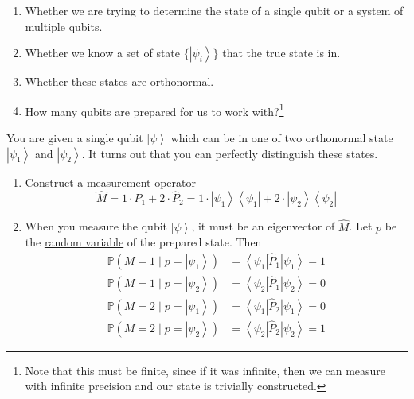 \documentclass{article}
\newcommand{\ket}[1]{\ensuremath{\left|#1\right\rangle}}
\newcommand{\bra}[1]{\ensuremath{\left\langle#1\right|}}
\newcounter{example}[section]
\begin{document}
    \begin{enumerate}
      \item Whether we are trying to determine the state of a single qubit or a system of multiple qubits. 
      \item Whether we know a set of state $\{\ket{\psi_i}\}$ that the true state is in. 
      \item Whether these states are orthonormal. 
      \item How many qubits are prepared for us to work with?\footnote{Note that this must be finite, since if it was infinite, then we can measure with infinite precision and our state is trivially constructed.}
    \end{enumerate}

    \begin{example}
      \label{ex:distinguishing-two-orthonormal-states}
      You are given a single qubit $\ket{\psi}$ which can be in one of two orthonormal state $\ket{\psi_1}$ and $\ket{\psi_2}$. It turns out that you can perfectly distinguish these states. 
      \begin{enumerate}
        \item Construct a measurement operator 
          \begin{equation}
            \hat{M} = 1 \cdot \hat{P}_1 + 2 \cdot \hat{P}_2 = 1 \cdot \ket{\psi_1} \bra{\psi_1} + 2 \cdot \ket{\psi_2} \bra{\psi_2} 
          \end{equation}
        \item When you measure the qubit $\ket{\psi}$, it must be an eigenvector of $\hat{M}$. Let $p$ be the \hyperref[prob-def:random-variable]{random variable} of the prepared state. Then 
          \begin{align}
            \mathbb{P}(M = 1 \mid p = \ket{\psi_1}) & = \bra{\psi_1} \hat{P}_1 \ket{\psi_1} = 1 \\ 
            \mathbb{P}(M = 1 \mid p = \ket{\psi_2}) & = \bra{\psi_2} \hat{P}_1 \ket{\psi_2} = 0 \\ 
            \mathbb{P}(M = 2 \mid p = \ket{\psi_1}) & = \bra{\psi_1} \hat{P}_2 \ket{\psi_1} = 0 \\
            \mathbb{P}(M = 2 \mid p = \ket{\psi_2}) & = \bra{\psi_2} \hat{P}_2 \ket{\psi_2} = 1
          \end{align}


\end{enumerate}
\end{example}
\end{document}
